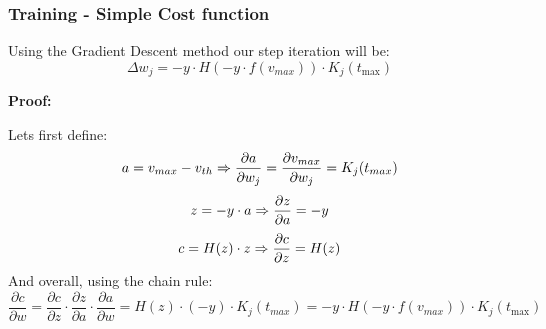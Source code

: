 \subsubsection{Training - Simple Cost function}

\begin{mdframed}[backgroundcolor=red_background, linecolor=black, linewidth=2pt, frametitle=\textbf{Statement}]
\begin{center}

    \label{st:GD-simple-medel}
    Using the Gradient Descent method our step iteration will be:
    \begin{equation}
        \Delta w_j = -y \cdot H(-y \cdot f(v_{max})) \cdot K_j(t_{\text{max}})
    \end{equation}

\end{center}
\end{mdframed}

\textbf{Proof:}

Lets first define:
\begin{equation} \notag
    a = v_{max}-v_{th} \Rightarrow \frac{\partial{a}}{\partial{w_j}} = \frac{\partial{v_{max}}}{\partial{w_j}} = K_j(t_{max})
\end{equation}
\begin{equation} \notag
    z = -y \cdot a \Rightarrow \frac{\partial{z}}{\partial{a}} = -y
\end{equation}
\begin{equation} \notag
    c = H(z) \cdot z \Rightarrow \frac{\partial{c}}{\partial{z}} = H(z)
\end{equation}
And overall, using the chain rule:
\begin{equation}
    \frac{\partial{c}}{\partial{w}} = \frac{\partial{c}}{\partial{z}} \cdot \frac{\partial{z}}{\partial{a}} \cdot \frac{\partial{a}}{\partial{w}} = H(z) \cdot (-y) \cdot K_j(t_{max}) = -y \cdot H(-y \cdot f(v_{max})) \cdot K_j(t_{\text{max}})
\end{equation}

